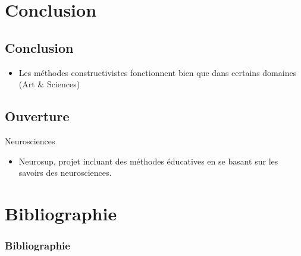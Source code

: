 \section{Conclusion}
\subsection{Conclusion}
\begin{frame}
  \begin{itemize}
    \item Les méthodes constructivistes fonctionnent bien que dans certains domaines (Art \& Sciences)
  \end{itemize}
\end{frame}

\subsection{Ouverture}
\begin{frame}
  \begin{block}{Neurosciences}
    \begin{itemize}
      \item Neurosup, projet incluant des méthodes éducatives en se basant sur les savoirs des neurosciences.
    \end{itemize}
  \end{block}
\end{frame}

\section*{Bibliographie}

\begin{frame}[allowframebreaks]
\frametitle{Bibliographie}

\end{frame}